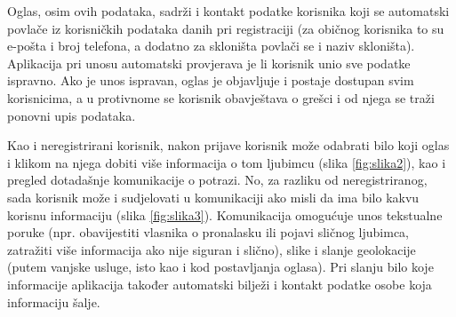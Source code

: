 		Oglas, osim ovih podataka, sadrži i kontakt podatke korisnika koji se automatski povlače iz korisničkih podataka danih pri registraciji (za običnog korisnika to su e-pošta i broj telefona, a dodatno za skloništa povlači se i naziv skloništa). Aplikacija pri unosu automatski provjerava je li korisnik unio sve podatke ispravno. Ako je unos ispravan, oglas je objavljuje i postaje dostupan svim korisnicima, a u protivnome se korisnik obavještava o grešci i od njega se traži ponovni upis podataka.

Kao i neregistrirani korisnik, nakon prijave korisnik može odabrati bilo koji oglas i klikom na njega dobiti više informacija o tom ljubimcu (slika \ref{fig:slika2}), kao i pregled dotadašnje komunikacije o potrazi. No, za razliku od neregistriranog, sada korisnik može i sudjelovati u komunikaciji ako misli da ima bilo kakvu korisnu informaciju (slika \ref{fig:slika3}). Komunikacija omogućuje unos tekstualne poruke (npr. obavijestiti vlasnika o pronalasku ili pojavi sličnog ljubimca, zatražiti više informacija ako nije siguran i slično), slike i slanje geolokacije (putem vanjske usluge, isto kao i kod postavljanja oglasa). Pri slanju bilo koje informacije aplikacija također automatski bilježi i kontakt podatke osobe koja informaciju šalje.

